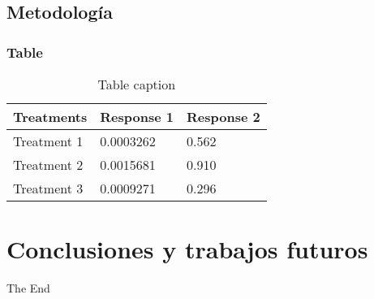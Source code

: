 \documentclass{beamer}
\begin{document}
\subsection{Metodología} 
\begin{frame}
\frametitle{Table}
\begin{table}
\begin{tabular}{l l l}
\toprule
\textbf{Treatments} & \textbf{Response 1} & \textbf{Response 2}\\
\midrule
Treatment 1 & 0.0003262 & 0.562 \\
Treatment 2 & 0.0015681 & 0.910 \\
Treatment 3 & 0.0009271 & 0.296 \\
\bottomrule
\end{tabular}
\caption{Table caption}
\end{table}
\end{frame}
\section{Conclusiones y trabajos futuros}




\begin{frame}
\Huge{\centerline{The End}}
\end{frame}

\end{document}
